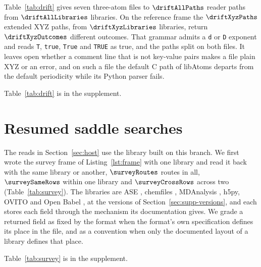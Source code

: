 \documentclass[preprint,12pt]{elsarticle}
\begin{document}
Table~\ref{tab:drift} gives seven three-atom files to \(\driftAllPaths\)
reader paths from \(\driftAllLibraries\) libraries.
On the reference frame the \(\driftXyzPaths\) extended XYZ paths, from
\(\driftXyzLibraries\) libraries, return \(\driftXyzOutcomes\) different
outcomes.
That grammar admits a \texttt{d} or \texttt{D} exponent and reads
\texttt{T}, \texttt{true}, \texttt{True} and \texttt{TRUE} as true, and
the paths split on both files.
It leaves open whether a comment line that is not key-value pairs makes
a file plain XYZ or an error, and on such a file the default C path of
libAtoms departs from the default periodicity while its Python parser
fails.

Table~\ref{tab:drift} is in the supplement.

\section{Resumed saddle searches}\label{sec:cases} The reads in
Section~\ref{sec:host} use the library built on this branch.
We first wrote the survey frame of Listing~\ref{lst:frame} with one
library and read it back with the same library or another,
\(\surveyRoutes\) routes in all, \(\surveySameRows\) within one library
and \(\surveyCrossRows\) across two (Table~\ref{tab:survey}).
The libraries are ASE \cite{larsenAtomicSimulationEnvironmenta2017},
chemfiles \cite{frauxChemfileschemfilesVersion01042023}, MDAnalysis
\cite{gowersMdanalysisPythonPackage2016,gowersMdanalysismdanalysisRelease21002025},
h5py, OVITO \cite{stukowskiVisualizationAnalysisAtomistic2010} and Open
Babel \cite{oboyleOpenBabelOpen2011}, at the versions of
Section~\ref*{sec:supp-versions}, and each stores each field through the
mechanism its documentation gives.
We grade a returned field as fixed by the format when the format's own
specification defines its place in the file, and as a convention when
only the documented layout of a library defines that place.

Table~\ref{tab:survey} is in the supplement.
\end{document}
